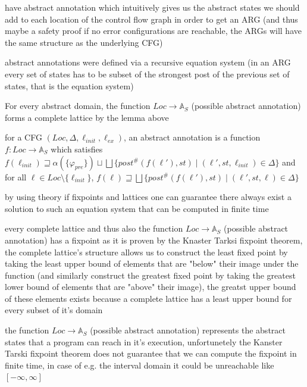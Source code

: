 \documentclass[a4paper]{article}
\begin{document}
\begin{minipage}[t]{0.16\linewidth}
\begin{betterlist}
{{\begin{betterlist}
\begin{betterlist}
					\end{betterlist}
					\item have abstract annotation which intuitively gives us the abstract states we should add to each location of the control flow graph in order to get an ARG (and thus maybe a safety proof if no error configurations are reachable, the ARGs will have the same structure as the underlying CFG)%
					\begin{betterlist}
						\item abstract annotations were defined via a recursive equation system (in an ARG every set of states has to be subset of the strongest post of the previous set of states, that is the equation system)
						\item For every abstract domain, the function $Loc \rightarrow \mathbb{A}_S$ (possible abstract annotation) forms a complete lattice by the lemma above
						\item for a CFG $(Loc, \Delta, \ell_{init}, \ell_{ex})$, an abstract annotation is a function $f: Loc \rightarrow \mathbb{A}_S$ which satisfies $f(\ell_{init}) \sqsupseteq \alpha(\{\varphi_{pre}\}) \sqcup \bigsqcup \{post^\#(f(\ell'), st) \mid (\ell′, st, \ell_{init}) \in \Delta\}$ and for all $\ell \in Loc \setminus \{\ell_{init}\}$, $f(\ell) \sqsupseteq \bigsqcup \{post^\#(f(\ell'), st) \mid (\ell', st, \ell) \in \Delta\}$
					\end{betterlist}
					\item by using theory if fixpoints and lattices one can guarantee there always exist a solution to such an equation system that can be computed in finite time
					\begin{betterlist}
						\item every complete lattice and thus also the function $Loc \rightarrow \mathbb{A}_S$ (possible abstract annotation) has a fixpoint as it is proven by the Knaster Tarksi fixpoint theorem, the complete lattice's structure allows us to construct the least fixed point by taking the least upper bound of elements that are "below" their image under the function (and similarly construct the greatest fixed point by taking the greatest lower bound of elements that are "above" their image), the greatst upper bound of these elements exists because a complete lattice has a least upper bound for every subset of it's domain
						\item the function $Loc \rightarrow \mathbb{A}_S$ (possible abstract annotation) represents the abstract states that a program can reach in it's execution, unfortunetely the Kanster Tarski fixpoint theorem does not guarantee that we can compute the fixpoint in finite time, in case of e.g. the interval domain it could be unreachable like $[-\infty, \infty]$

\end{betterlist}
\end{betterlist}}}
\end{betterlist}
\end{minipage}
\end{document}
